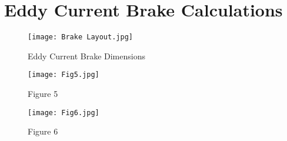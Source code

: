 \newpage
{} 
\setcounter{page}{1}
\appendix
\renewcommand\thechapter{A}

\chapter{Eddy Current Brake Calculations}

\begin{figure}[H]
	\begin{center}
		\texttt{[image: Brake Layout.jpg]}
		\caption{Eddy Current Brake Dimensions}
		\label{fig:EB}
	\end{center}
\end{figure}

\newpage


\begin{figure}[H]
	\begin{center}
		\texttt{[image: Fig5.jpg]}
		\caption{Figure 5}
		\label{fig:5}
	\end{center}
\end{figure}

\begin{figure}[H]
	\begin{center}
		\texttt{[image: Fig6.jpg]}
		\caption{Figure 6}
		\label{fig:6}
	\end{center}
\end{figure}